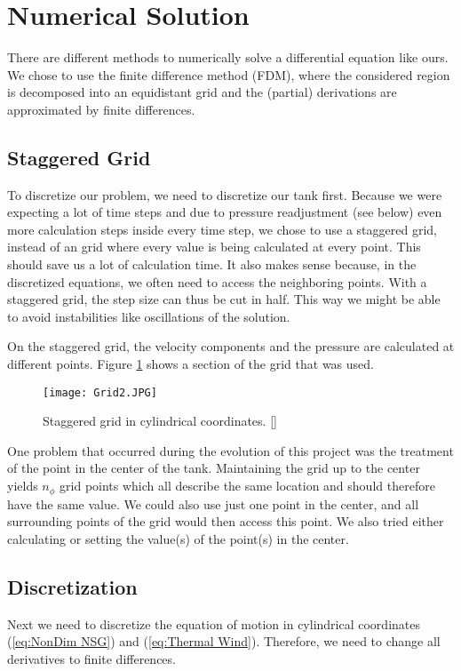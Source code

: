 \documentclass[12pt, a4paper]{article} %
\newcommand{\todoEnglish}{\todo[color=red!20]}
\begin{document}
	\newpage		
\section{Numerical Solution
}
	There are different methods to numerically solve a differential equation like ours. We chose to use the finite difference method (FDM), where the considered region is decomposed into an equidistant grid and the (partial) derivations are approximated by finite differences.
	
	
	\subsection{Staggered Grid} %
		To discretize our problem, we need to discretize our tank first. Because we were expecting a lot of time steps and due to pressure readjustment (see below) even more calculation steps inside every time step, we chose to use a staggered grid, instead of an grid where every value is being calculated at every point. This should save us a lot of calculation time. It also makes sense because, in the discretized equations, we often need to access the neighboring points. With a staggered grid, the step size can thus be cut in half. This way we might be able to avoid instabilities like oscillations of the solution.
		
		On the staggered grid, the velocity components and the pressure are calculated at different points. Figure \ref{fig:Grid} shows a section of the grid that was used.
		
		\begin{figure}[H]
			\centering
			\texttt{[image: Grid2.JPG]}
			\caption{Staggered grid in cylindrical coordinates. [\cite{GridFigURL}]} %
			\label{fig:Grid}
		\end{figure}
		
		One problem that occurred during the evolution of this project was the treatment of the point in the center of the tank. Maintaining the grid up to the center yields $n_\phi$ grid points which all describe the same location and should therefore have the same value. We could also use just one point in the center, and all surrounding points of the grid would then access this point. We also tried either calculating or setting the value(s) of the point(s) in the center.
		\todoEnglish{this doesn't sound good yet.}
		
	\subsection{Discretization} %
		Next we need to discretize the equation of motion in cylindrical coordinates (\ref{eq:NonDim NSG}) and (\ref{eq:Thermal Wind}). Therefore, we need to change all derivatives to finite differences. 
		
\end{document}
